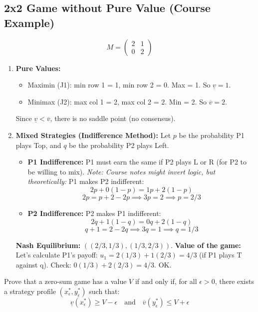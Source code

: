 \subsection{2x2 Game without Pure Value (Course Example)}
$$M = \begin{pmatrix} 2 & 1 \\ 0 & 2 \end{pmatrix}$$
\begin{enumerate}
    \item \textbf{Pure Values:}
    \begin{itemize}
        \item Maximin (J1): min row 1 = 1, min row 2 = 0. Max = 1. So $\underline{v} = 1$.
        \item Minimax (J2): max col 1 = 2, max col 2 = 2. Min = 2. So $\overline{v} = 2$.
    \end{itemize}
    Since $\underline{v} < \overline{v}$, there is no saddle point (no consensus).

    \item \textbf{Mixed Strategies (Indifference Method):}
    Let $p$ be the probability P1 plays Top, and $q$ be the probability P2 plays Left.
    \begin{itemize}
        \item \textbf{P1 Indifference:} P1 must earn the same if P2 plays L or R (for P2 to be willing to mix).
         \textit{Note: Course notes might invert logic, but theoretically:}
         P1 makes P2 indifferent:
         $$2p + 0(1-p) = 1p + 2(1-p)$$
         $$2p = p + 2 - 2p \implies 3p = 2 \implies p = 2/3$$
        
        \item \textbf{P2 Indifference:} P2 makes P1 indifferent:
        $$2q + 1(1-q) = 0q + 2(1-q)$$
        $$q + 1 = 2 - 2q \implies 3q = 1 \implies q = 1/3$$
    \end{itemize}
    \textbf{Nash Equilibrium:} $((2/3, 1/3), (1/3, 2/3))$.
    \textbf{Value of the game:} Let's calculate P1's payoff:
    $u_1 = 2(1/3) + 1(2/3) = 4/3$ (if P1 plays T against q).
    Check: $0(1/3) + 2(2/3) = 4/3$. OK.
\end{enumerate}

\begin{exercice}
Prove that a zero-sum game has a value $V$ if and only if, for all $\epsilon > 0$, there exists a strategy profile $(x^*_\epsilon, y^*_\epsilon)$ such that:
$$ \underline{v}(x^*_\epsilon) \ge V - \epsilon \quad \text{and} \quad \overline{v}(y^*_\epsilon) \le V + \epsilon $$
\end{exercice}

